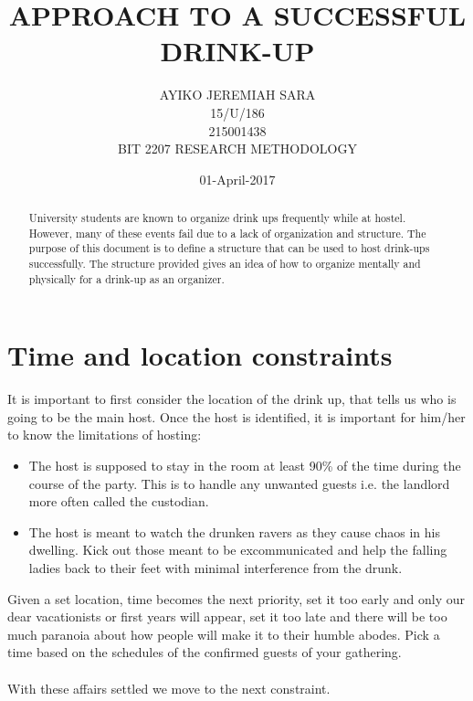 \documentclass{article}
\begin{document}
\title{APPROACH TO A SUCCESSFUL DRINK-UP}
\date{01-April-2017}
\author{AYIKO JEREMIAH SARA\\15/U/186\\215001438\\BIT 2207 RESEARCH METHODOLOGY}


\maketitle
\newpage


\begin{abstract}
University students are known to organize drink ups frequently while at hostel. However, many of these events fail due to a lack of organization and structure. The purpose of this document is to define a structure that can be used to host drink-ups successfully. The structure provided gives an idea of how to organize mentally and physically for a drink-up as an organizer. 
\end{abstract}
\newpage

\section{Time and location constraints}
It is important to first consider the location of the drink up, that tells us who is going to be the main host. Once the host is identified, it is important for him/her to know the limitations of hosting:

\begin{itemize}
\item
The host is supposed to stay in the room at least 90\% of the time during the course of the party. This is to handle any unwanted guests i.e. the landlord more often called the custodian.
\item
The host is meant to watch the drunken ravers as they cause chaos in his dwelling. Kick out those meant to be excommunicated and help the falling ladies back to their feet with minimal interference from the drunk.
\end{itemize}
Given a set location, time becomes the next priority, set it too early and only our dear vacationists or first years will appear, set it too late and there will be too much paranoia about how people will make it to their humble abodes. Pick a time based on the schedules of the confirmed guests of your gathering. 
\paragraph{}
With these affairs settled we move to the next constraint.
\end{document}
